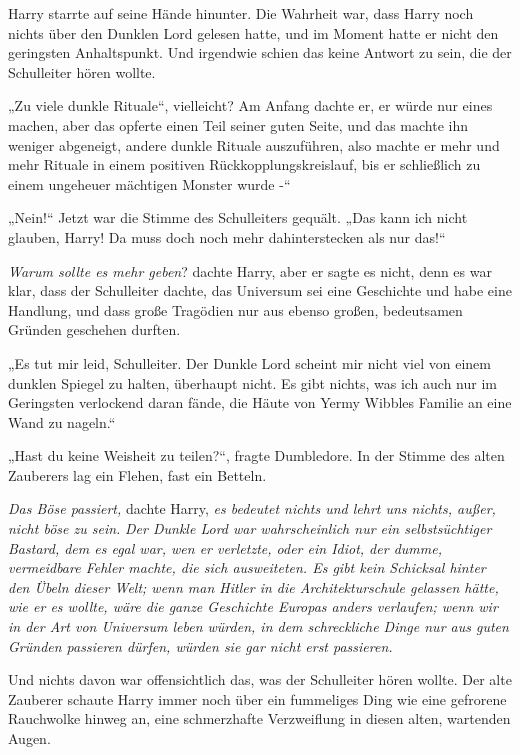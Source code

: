 {Harry starrte auf seine Hände hinunter. Die Wahrheit war, dass Harry noch nichts über den Dunklen Lord gelesen hatte, und im Moment hatte er nicht den geringsten Anhaltspunkt. Und irgendwie schien das keine Antwort zu sein, die der Schulleiter hören wollte.

„Zu viele dunkle Rituale“, vielleicht? Am Anfang dachte er, er würde nur eines machen, aber das opferte einen Teil seiner guten Seite, und das machte ihn weniger abgeneigt, andere dunkle Rituale auszuführen, also machte er mehr und mehr Rituale in einem positiven Rückkopplungskreislauf, bis er schließlich zu einem ungeheuer mächtigen Monster wurde -“

„Nein!“ Jetzt war die Stimme des Schulleiters gequält. „Das kann ich nicht glauben, Harry! Da muss doch noch mehr dahinterstecken als nur das!“

\emph{Warum sollte es mehr geben}? dachte Harry, aber er sagte es nicht, denn es war klar, dass der Schulleiter dachte, das Universum sei eine Geschichte und habe eine Handlung, und dass große Tragödien nur aus ebenso großen, bedeutsamen Gründen geschehen durften.

„Es tut mir leid, Schulleiter. Der Dunkle Lord scheint mir nicht viel von einem dunklen Spiegel zu halten, überhaupt nicht. Es gibt nichts, was ich auch nur im Geringsten verlockend daran fände, die Häute von Yermy Wibbles Familie an eine Wand zu nageln.“

„Hast du keine Weisheit zu teilen?“, fragte Dumbledore. In der Stimme des alten Zauberers lag ein Flehen, fast ein Betteln.

\emph{Das Böse passiert,} dachte Harry, \emph{es bedeutet nichts und lehrt uns nichts, außer, nicht böse zu sein.} \emph{Der Dunkle Lord war wahrscheinlich nur ein selbstsüchtiger Bastard, dem es egal war, wen er verletzte, oder ein Idiot, der dumme, vermeidbare Fehler machte, die sich ausweiteten. Es gibt kein Schicksal hinter den Übeln dieser Welt; wenn man Hitler in die Architekturschule gelassen hätte, wie er es wollte, wäre die ganze Geschichte Europas anders verlaufen; wenn wir in der Art von Universum leben würden, in dem schreckliche Dinge nur aus guten Gründen passieren dürfen, würden sie gar nicht erst passieren.}

Und nichts davon war offensichtlich das, was der Schulleiter hören wollte. Der alte Zauberer schaute Harry immer noch über ein fummeliges Ding wie eine gefrorene Rauchwolke hinweg an, eine schmerzhafte Verzweiflung in diesen alten, wartenden Augen.

}
